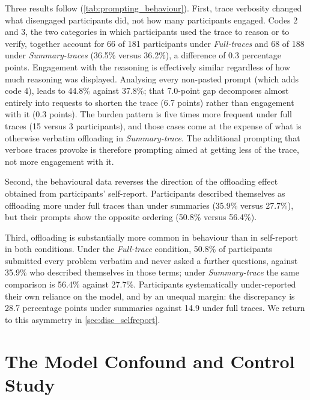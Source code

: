 \documentclass[manuscript,review,anonymous]{acmart}
\begin{document}
Three results follow (\autoref{tab:prompting_behaviour}). First, trace verbosity changed what disengaged participants did,
not how many participants engaged. Codes 2 and 3, the two categories in which participants used the trace to reason or to verify, together account for 66 of 181
participants under \textit{Full-traces} and 68 of 188 under \textit{Summary-traces} (36.5\% versus
36.2\%), a difference of 0.3 percentage points.  Engagement with the reasoning
is effectively similar regardless of how much reasoning was displayed. Analysing
every non-pasted prompt (which adds code 4), leads to 44.8\% against 37.8\%; that 7.0-point gap decomposes almost entirely into requests to shorten the trace
(6.7 points) rather than engagement with it (0.3 points). The burden pattern is five
times more frequent under full traces (15 versus 3 participants), and those cases
come at the expense of what is otherwise verbatim offloading in \textit{Summary-trace}. The additional prompting that verbose traces provoke is
therefore prompting aimed at getting less of the trace, not more engagement with
it.

Second, the behavioural data reverses the direction of the offloading effect obtained from participants' self-report. Participants described themselves as
offloading more under full traces than under summaries (35.9\% versus 27.7\%),
but their prompts show the opposite ordering (50.8\% versus 56.4\%).

Third, offloading is substantially more common in behaviour than in
self-report in both conditions. Under the \textit{Full-trace} condition, 50.8\% of participants
submitted every problem verbatim and never asked a further questions,
against 35.9\% who described themselves in those terms; under \textit{Summary-trace} the same
comparison is 56.4\% against 27.7\%. Participants systematically under-reported
their own reliance on the model, and by an unequal margin: the discrepancy is 28.7 percentage points under summaries against 14.9 under full traces.  We return to this asymmetry in \autoref{sec:disc_selfreport}.


\section{The Model Confound and Control Study}\label{sec:interim}
\end{document}
